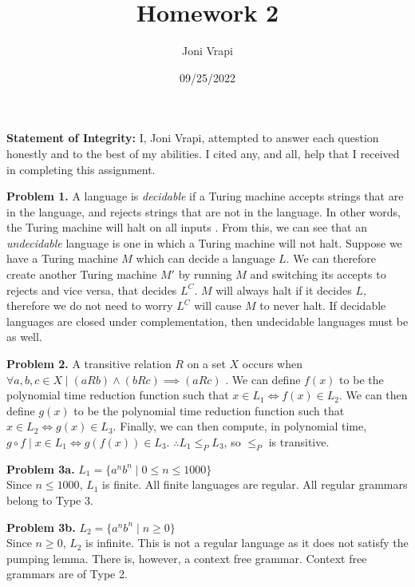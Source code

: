 \documentclass{article}
\title{Homework 2}
\author{Joni Vrapi}
\date{09/25/2022}
\begin{document}
\maketitle

\textbf{Statement of Integrity:} I, Joni Vrapi, attempted to answer each question honestly and to the best of my abilities. I cited any, and all, help that I received in completing this assignment.

\hfill

\textbf{Problem 1.} A language is \emph{decidable} if a Turing machine accepts strings that are in the language, and rejects strings that are not in the language. In other words, the Turing machine will halt on all inputs \cite{website:1}. From this, we can see that an \emph{undecidable} language is one in which a Turing machine will not halt. Suppose we have a Turing machine $M$ which can decide a language $L$. We can therefore create another Turing machine $M'$ by running $M$ and switching its accepts to rejects and vice versa, that decides $L^C$. $M$ will always halt if it decides $L$, therefore we do not need to worry $L^C$ will cause $M$ to never halt. If decidable languages are closed under complementation, then undecidable languages must be as well.

\hfill

\textbf{Problem 2.} A transitive relation $R$ on a set $X$ occurs when $\forall a, b, c \in X \mid (aRb) \land (bRc) \implies (aRc)$ \cite{website:2}. We can define $f(x)$ to be the polynomial time reduction function such that $x \in L_1 \iff f(x) \in L_2$. We can then define $g(x)$ to be the polynomial time reduction function such that $x \in L_2 \iff g(x) \in L_3$. Finally, we can then compute, in polynomial time, $g \circ f \mid x \in L_1 \iff g(f(x)) \in L_3$. $\therefore L_1 \leq_P L_3$, so $\leq_P$ is transitive.

\hfill

\textbf{Problem 3a.} $L_1 = \{ a^nb^n \mid 0 \leq n \leq 1000 \}$ \\
Since $n \leq 1000$,  $L_1$ is finite. All finite languages are regular. All regular grammars belong to Type 3.

\hfill

\textbf{Problem 3b.} $L_2 = \{ a^nb^n \mid n \geq 0 \}$ \\
Since $n \geq 0$,  $L_2$ is infinite. This is not a regular language as it does not satisfy the pumping lemma. There is, however, a context free grammar. Context free grammars are of Type 2.
\end{document}
